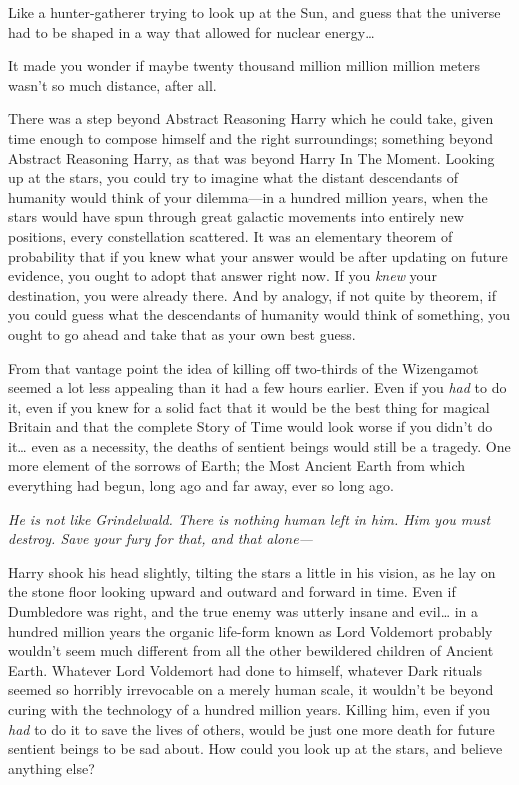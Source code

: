 Like a hunter-gatherer trying to look up at the Sun, and guess that the universe had to be shaped in a way that allowed for nuclear energy{\ldots}

It made you wonder if maybe twenty thousand million million million meters wasn't so much distance, after all.

There was a step beyond Abstract Reasoning Harry which he could take, given time enough to compose himself and the right surroundings; something beyond Abstract Reasoning Harry, as that was beyond Harry In The Moment. Looking up at the stars, you could try to imagine what the distant descendants of humanity would think of your dilemma---in a hundred million years, when the stars would have spun through great galactic movements into entirely new positions, every constellation scattered. It was an elementary theorem of probability that if you knew what your answer would be after updating on future evidence, you ought to adopt that answer right now. If you \emph{knew} your destination, you were already there. And by analogy, if not quite by theorem, if you could guess what the descendants of humanity would think of something, you ought to go ahead and take that as your own best guess.

From that vantage point the idea of killing off two-thirds of the Wizengamot seemed a lot less appealing than it had a few hours earlier. Even if you \emph{had} to do it, even if you knew for a solid fact that it would be the best thing for magical Britain and that the complete Story of Time would look worse if you didn't do it{\ldots} even as a necessity, the deaths of sentient beings would still be a tragedy. One more element of the sorrows of Earth; the Most Ancient Earth from which everything had begun, long ago and far away, ever so long ago.

\emph{He is not like Grindelwald. There is nothing human left in him. Him you must destroy. Save your fury for that, and that alone---}

Harry shook his head slightly, tilting the stars a little in his vision, as he lay on the stone floor looking upward and outward and forward in time. Even if Dumbledore was right, and the true enemy was utterly insane and evil{\ldots} in a hundred million years the organic life-form known as Lord Voldemort probably wouldn't seem much different from all the other bewildered children of Ancient Earth. Whatever Lord Voldemort had done to himself, whatever Dark rituals seemed so horribly irrevocable on a merely human scale, it wouldn't be beyond curing with the technology of a hundred million years. Killing him, even if you \emph{had} to do it to save the lives of others, would be just one more death for future sentient beings to be sad about. How could you look up at the stars, and believe anything else?


